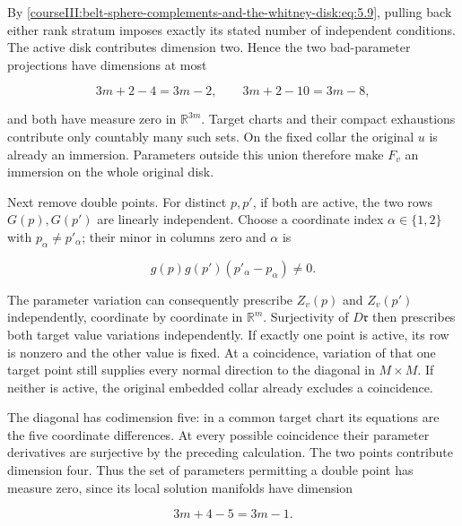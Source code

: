 By \eqref{courseIII:belt-sphere-complements-and-the-whitney-disk:eq:5.9}, pulling back either rank stratum imposes exactly its stated number of independent conditions. The active disk contributes dimension two. Hence the two bad-parameter projections have dimensions at most

\begin{equation}
3m+2-4=3m-2,\qquad
3m+2-10=3m-8,
\label{courseIII:belt-sphere-complements-and-the-whitney-disk:eq:5.10}
\end{equation}

and both have measure zero in \(\mathbb R^{3m}\). Target charts and their compact exhaustions contribute only countably many such sets. On the fixed collar the original \(u\) is already an immersion. Parameters outside this union therefore make \(F_v\) an immersion on the whole original disk.

Next remove double points. For distinct \(p,p'\), if both are active, the two rows \(G(p),G(p')\) are linearly independent. Choose a coordinate index \(\alpha\in\{1,2\}\) with \(p_\alpha\ne p'_\alpha\); their minor in columns zero and \(\alpha\) is

\begin{equation}
g(p)g(p')(p'_\alpha-p_\alpha)\ne0.
\label{courseIII:belt-sphere-complements-and-the-whitney-disk:eq:5.11}
\end{equation}

The parameter variation can consequently prescribe \(Z_v(p)\) and \(Z_v(p')\) independently, coordinate by coordinate in \(\mathbb R^m\). Surjectivity of \(D\mathfrak r\) then prescribes both target value variations independently. If exactly one point is active, its row is nonzero and the other value is fixed. At a coincidence, variation of that one target point still supplies every normal direction to the diagonal in \(M\times M\). If neither is active, the original embedded collar already excludes a coincidence.

The diagonal has codimension five: in a common target chart its equations are the five coordinate differences. At every possible coincidence their parameter derivatives are surjective by the preceding calculation. The two points contribute dimension four. Thus the set of parameters permitting a double point has measure zero, since its local solution manifolds have dimension

\begin{equation}
3m+4-5=3m-1.
\label{courseIII:belt-sphere-complements-and-the-whitney-disk:eq:5.12}
\end{equation}

